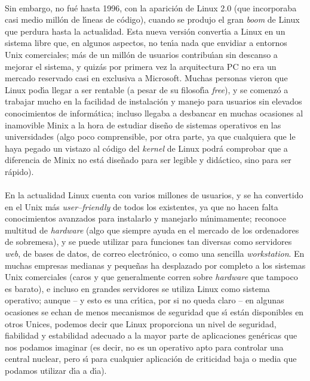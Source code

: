 \\Sin embargo, no fu\'e hasta 1996, con la aparici\'on de Linux 2.0 (que 
incorporaba casi medio mill\'on de l\'{\i}neas de c\'odigo), cuando se produjo
el gran {\it boom} de Linux que perdura hasta la actualidad. Esta nueva 
versi\'on convert\'{\i}a a Linux en un sistema libre que, en algunos aspectos, 
no ten\'{\i}a nada que envidiar a entornos Unix comerciales; m\'as de un 
mill\'on de usuarios contribu\'{\i}an sin descanso a mejorar el sistema, y 
quiz\'as por primera vez la arquitectura PC no era un mercado reservado casi en
exclusiva a Microsoft. Muchas personas vieron que Linux pod\'{\i}a llegar a ser 
rentable (a pesar de su filosof\'{\i}a {\it free}), y se comenz\'o a trabajar 
mucho en la facilidad de instalaci\'on y manejo para usuarios sin elevados 
conocimientos de inform\'atica; incluso llegaba a desbancar en muchas ocasiones
al inamovible Minix a la hora de estudiar dise\~no de sistemas operativos en las
universidades (algo poco comprensible, por otra parte, ya que cualquiera que 
le haya pegado un vistazo al c\'odigo del {\it kernel} de Linux podr\'a 
comprobar que a diferencia de Minix no est\'a dise\~nado para ser legible y
did\'actico, sino para ser r\'apido).\\
\\En la actualidad Linux cuenta con varios millones de usuarios, y se ha 
convertido en el Unix m\'as {\it user--friendly} de todos los existentes, ya que
no hacen falta conocimientos avanzados para instalarlo y manejarlo 
m\'{\i}nimamente; reconoce multitud de {\it hardware} (algo que siempre ayuda
en el mercado de los ordenadores de sobremesa), y se puede utilizar para 
funciones tan diversas como servidores {\it web}, de bases de datos, de correo
electr\'onico, o como una sencilla {\it workstation}. En muchas empresas 
medianas y peque\~nas ha desplazado por completo a los sistemas Unix 
comerciales (caros y que generalmente corren sobre {\it hardware} que tampoco 
es barato), e incluso en grandes servidores se utiliza Linux como sistema 
operativo; aunque -- y esto es una cr\'{\i}tica, por si no queda claro -- en
algunas ocasiones se echan de menos mecanismos de seguridad que s\'{\i} est\'an
disponibles en otros Unices, podemos decir que Linux proporciona un nivel de
seguridad, fiabilidad y estabilidad adecuado a la mayor parte de aplicaciones
gen\'ericas que nos podamos imaginar (es decir, no es un operativo apto para
controlar una central nuclear, pero s\'{\i} para cualquier aplicaci\'on de
criticidad baja o media que podamos utilizar d\'{\i}a a d\'{\i}a).\\
